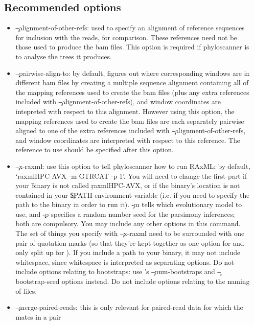 \subsection{Recommended options}
\begin{itemize}
\item \c{--alignment-of-other-refs}: used to specify an alignment of reference sequences for inclusion with the reads, for comparison.
These references need not be those used to produce the bam files.
This option is required if phyloscanner is to analyse the trees it produces.
\item \c{--pairwise-align-to}: by default, \p figures out where corresponding windows are in different bam files by creating a multiple sequence alignment containing all of the mapping references used to create the bam files (plus any extra references included with \c{--alignment-of-other-refs}), and window coordinates are intepreted with respect to this alignment.
However using this option, the mapping references used to create the bam files are each separately pairwise aligned to one of the extra references included with \c{--alignment-of-other-refs}, and window coordinates are interpreted with respect to this reference.
The reference to use should be specified after this option.
\item \c{--x-raxml}: use this option to tell phyloscanner how to run \c{RAxML}; by default, \c{`raxmlHPC-AVX -m GTRCAT -p 1'}.
You will need to change the first part if your \r binary is not called \c{raxmlHPC-AVX}, or if the binary's location is not contained in your \c{\$PATH} environment variable (i.e. if you need to specify the path to the binary in order to run it).
\c{-m} tells \R which evolutionary model to use, and \c{-p} specifies a random number seed for the parsimony inferences; both are compulsory.
You may include any other \R options in this command.
The set of things you specify with \c{--x-raxml} need to be surrounded with one pair of quotation marks (so that they're kept together as one option for \p and only split up for \R).
If you include a path to your \R binary, it may not include whitespace, since whitespace is interpreted as separating \R options.
Do not include options relating to bootstraps: use \p's \c{--num-bootstraps} and \c{--bootstrap-seed} options instead.
Do not include options relating to the naming of files.
\item \c{--merge-paired-reads}: this is only relevant for paired-read data for which the mates in a pair

\end{itemize}

